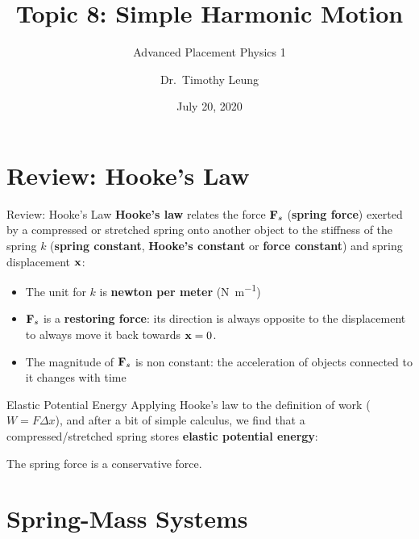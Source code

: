 \documentclass[12pt,compress,aspectratio=169]{beamer}
\title{Topic 8: Simple Harmonic Motion}
\subtitle{Advanced Placement Physics 1}
\author[TML]{Dr.\ Timothy Leung}
\institute{Olympiads School\\Toronto, ON, Canada}
\date{July 20, 2020}
\newcommand{\mb}[1]{\ensuremath\mathbf{#1}}
\newcommand{\eq}[2]{\vspace{#1}{\Large\begin{displaymath}#2\end{displaymath}}}
\begin{document}
\begin{frame}
  \maketitle
\end{frame}


\section{Review: Hooke's Law}

\begin{frame}{Review: Hooke's Law}
  \textbf{Hooke's law} relates the force $\mb{F}_s$ (\textbf{spring force})
  exerted by a compressed or stretched spring onto another object to the
  stiffness of the spring $k$ (\textbf{spring constant}, \textbf{Hooke's
    constant} or \textbf{force constant}) and spring displacement $\mb{x}$:

  \eq{-.1in}{
    \boxed{\mb{F}_s=-k\mb{x}}
  }

  \begin{itemize}
  \item\vspace{-.1in}The unit for $k$ is \textbf{newton per meter}
    (\si{\newton\per\metre})
  \item $\mb{F}_s$ is a \textbf{restoring force}: its direction is always
    opposite to the displacement to always move it back towards $\mb{x}=0$.
  \item The magnitude of $\mb{F}_s$ is non constant: the acceleration of
    objects connected to it changes with time
  \end{itemize}
\end{frame}



\begin{frame}{Elastic Potential Energy}
  Applying Hooke's law to the  definition of work ($W=F\Delta x$), and after a
  bit of simple calculus, we find that a compressed/stretched spring stores
  \textbf{elastic potential energy}:
  
  \eq{-.1in}{
    \boxed{U_e=\frac12kx^2}
  }

  The spring force is a conservative force.
\end{frame}



\section{Spring-Mass Systems}
\end{document}

